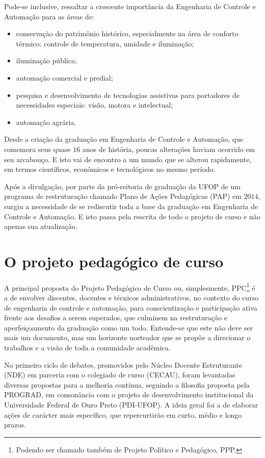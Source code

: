 Pode-se inclusive, ressaltar a crescente importância da Engenharia de Controle e Automação para as áreas de:
\begin{itemize}
\item conservação do patrimônio histórico, especialmente na área de conforto térmico: controle de temperatura, umidade e iluminação;
\item iluminação pública;
\item automação comercial e predial;
\item pesquisa e desenvolvimento de tecnologias assistivas para portadores de necessidades especiais: visão, motora e intelectual;
\item automação agrária.
\end{itemize}

Desde a criação da graduação em Engenharia de Controle e Automação, que comemora seus quase $16$ anos de história, poucas alterações haviam ocorrido em seu arcabouço. E isto vai de encontro a um mundo que se alterou rapidamente, em termos científicos, econômicos e tecnológicos no mesmo período.

Após a divulgação, por parte da pró-reitoria de graduação da UFOP de um programa de restruturação chamado Plano de Ações Pedagógicas (PAP) em $2014$, surgiu a necessidade de se rediscutir toda a base da graduação em Engenharia de Controle e Automação. E isto passa pela rescrita de todo o projeto de curso e não apenas sua atualização.

\section[O PPC]{O projeto pedag{\'o}gico de curso} \label{sec:ocurso}
%
A principal proposta do Projeto Pedagógico de Curso ou, simplesmente, PPC\footnote{Podendo ser chamado também de Projeto Político e Pedagógico, PPP.} {\'e} a de envolver discentes, docentes e t{\'e}cnicos administrativos, no contexto do curso de engenharia de controle e automa{\c c}{\~a}o, para conscientiza{\c c}{\~a}o  e participa{\c c}{\~a}o ativa frente aos desafios a serem superados, que culminem na restrutura{\c c}{\~a}o e aperfei{\c c}oamento da graduação como um todo. Entende-se que este n{\~a}o deve ser mais um documento, mas um horizonte norteador que se prop{\~o}e a direcionar o trabalhos e a vis{\~a}o de toda a comunidade acad{\^e}mica. 

No primeiro ciclo de debates, promovidos pelo N{\'u}cleo Docente Estruturante (NDE) em parceria com o colegiado de curso (CECAU), foram levantadas diversas propostas para a melhoria cont{\'i}nua, seguindo a filosofia proposta pela PROGRAD, em conson{\^a}ncia com o projeto de desenvolvimento institucional da Universidade Federal de Ouro Preto (PDI-UFOP). A ideia geral foi a de elaborar a{\c c}{\~o}es de car{\'a}cter mais espec{\'i}fico, que repercurtir{\~a}o em curto, m{\'e}dio e longo prazos.

